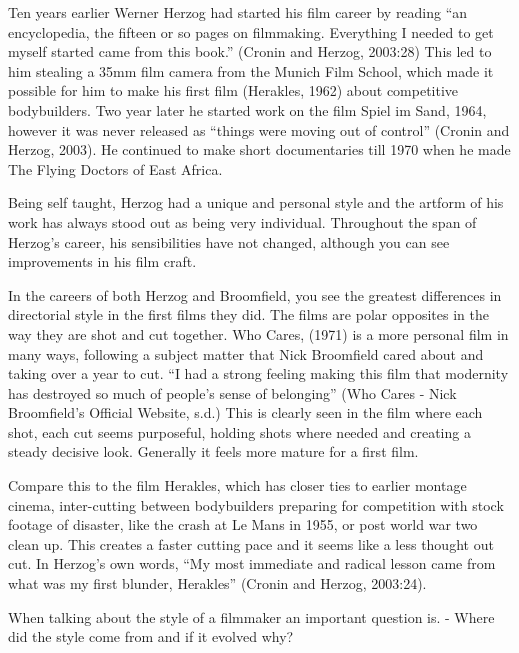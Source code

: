 \documentclass[
  12pt,
]{book}
\begin{document}
Ten years earlier Werner Herzog had started his film career by reading ``an encyclopedia, the fifteen or so pages on filmmaking. Everything I needed to get myself started came from this book.'' (Cronin and Herzog, 2003:28) This led to him stealing a 35mm film camera from the Munich Film School, which made it possible for him to make his first film (Herakles, 1962) about competitive bodybuilders. Two year later he started work on the film Spiel im Sand, 1964, however it was never released as ``things were moving out of control'' (Cronin and Herzog, 2003). He continued to make short documentaries till 1970 when he made The Flying Doctors of East Africa.

Being self taught, Herzog had a unique and personal style and the artform of his work has always stood out as being very individual. Throughout the span of Herzog's career, his sensibilities have not changed, although you can see improvements in his film craft.

In the careers of both Herzog and Broomfield, you see the greatest differences in directorial style in the first films they did. The films are polar opposites in the way they are shot and cut together. Who Cares, (1971) is a more personal film in many ways, following a subject matter that Nick Broomfield cared about and taking over a year to cut. ``I had a strong feeling making this film that modernity has destroyed so much of people's sense of belonging'' (Who Cares - Nick Broomfield's Official Website, s.d.) This is clearly seen in the film where each shot, each cut seems purposeful, holding shots where needed and creating a steady decisive look. Generally it feels more mature for a first film.

Compare this to the film Herakles, which has closer ties to earlier montage cinema, inter-cutting between bodybuilders preparing for competition with stock footage of disaster, like the crash at Le Mans in 1955, or post world war two clean up. This creates a faster cutting pace and it seems like a less thought out cut. In Herzog's own words, ``My most immediate and radical lesson came from what was my first blunder, Herakles'' (Cronin and Herzog, 2003:24).

When talking about the style of a filmmaker an important question is. - Where did the style come from and if it evolved why?
\end{document}
